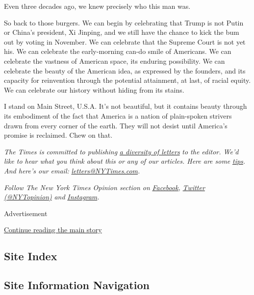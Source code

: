 Even three decades ago, we knew precisely who this man was.

So back to those burgers. We can begin by celebrating that Trump is not
Putin or China's president, Xi Jinping, and we still have the chance to
kick the bum out by voting in November. We can celebrate that the
Supreme Court is not yet his. We can celebrate the early-morning can-do
smile of Americans. We can celebrate the vastness of American space, its
enduring possibility. We can celebrate the beauty of the American idea,
as expressed by the founders, and its capacity for reinvention through
the potential attainment, at last, of racial equity. We can celebrate
our history without hiding from its stains.

I stand on Main Street, U.S.A. It's not beautiful, but it contains
beauty through its embodiment of the fact that America is a nation of
plain-spoken strivers drawn from every corner of the earth. They will
not desist until America's promise is reclaimed. Chew on that.

\emph{The Times is committed to publishing}
\href{https://www.nytimes3xbfgragh.onion/2019/01/31/opinion/letters/letters-to-editor-new-york-times-women.html}{\emph{a
diversity of letters}} \emph{to the editor. We'd like to hear what you
think about this or any of our articles. Here are some}
\href{https://help.nytimes3xbfgragh.onion/hc/en-us/articles/115014925288-How-to-submit-a-letter-to-the-editor}{\emph{tips}}\emph{.
And here's our email:}
\href{mailto:letters@NYTimes.com}{\emph{letters@NYTimes.com}}\emph{.}

\emph{Follow The New York Times Opinion section on}
\href{https://www.facebookcorewwwi.onion/nytopinion}{\emph{Facebook}}\emph{,}
\href{http://twitter.com/NYTOpinion}{\emph{Twitter (@NYTopinion)}}
\emph{and}
\href{https://www.instagram.com/nytopinion/}{\emph{Instagram}}\emph{.}

Advertisement

\protect\hyperlink{after-bottom}{Continue reading the main story}

\hypertarget{site-index}{%
\subsection{Site Index}\label{site-index}}

\hypertarget{site-information-navigation}{%
\subsection{Site Information
Navigation}\label{site-information-navigation}}

